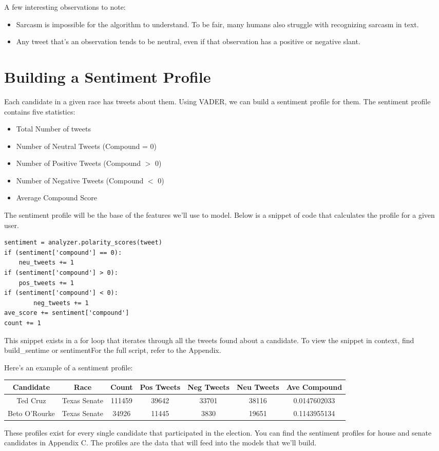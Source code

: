 \documentclass[11pt, twoside, reqno]{article}
\begin{document}
A few interesting observations to note:
\begin{itemize}
	\item Sarcasm is impossible for the algorithm to understand. To be fair, many humans also struggle with recognizing sarcasm in text.
	\item Any tweet that's an observation tends to be neutral, even if that observation has a positive or negative slant. 
\end{itemize}

\section{Building a Sentiment Profile}
Each candidate in a given race has tweets about them. Using VADER, we can build a sentiment profile for them. The sentiment profile contains five statistics:
\begin{itemize}
	\item Total Number of tweets
	\item Number of Neutral Tweets (Compound = 0)
	\item Number of Positive Tweets (Compound $>$ 0)
	\item Number of Negative Tweets (Compound $<$ 0)
	\item Average Compound Score
\end{itemize}
The sentiment profile will be the base of the features we'll use to model. Below is a snippet of code that calculates the profile for a given user.
\begin{verbatim}
sentiment = analyzer.polarity_scores(tweet)
if (sentiment['compound'] == 0):        
	neu_tweets += 1          
if (sentiment['compound'] > 0):        
	pos_tweets += 1            
if (sentiment['compound'] < 0):
        neg_tweets += 1
ave_score += sentiment['compound']
count += 1
\end{verbatim}
This snippet exists in a for loop that iterates through all the tweets found about a candidate. To view the snippet in context, find build\_sentime or sentimentFor the full script, refer to the Appendix. 

Here's an example of a sentiment profile:
\begin{center}
\begin{tabular}{ |c|c|c|c|c|c|c|} 
	\hline
	Candidate & Race & Count & Pos Tweets & Neg Tweets & Neu Tweets & Ave Compound\\
 	\hline 
	Ted Cruz & Texas Senate & 111459 & 39642 & 33701 & 38116 & 0.0147602033 \\
  	\hline
	Beto O'Rourke & Texas Senate & 34926 & 11445 & 3830 & 19651 & 0.1143955134 \\ 
	\hline
\end{tabular}
\end{center}
These profiles exist for every single candidate that participated in the election. You can find the sentiment profiles for house and senate candidates in Appendix C. The profiles are the data that will feed into the models that we'll build. 
\end{document}
